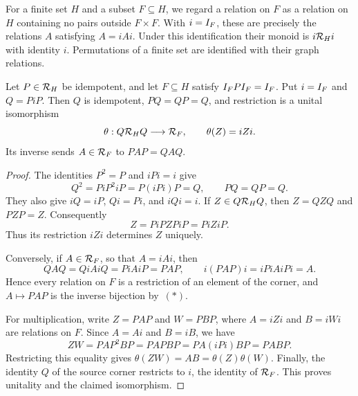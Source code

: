 For a finite set $H$ and a subset $F\subseteq H$, we regard a relation
on $F$ as a relation on $H$ containing no pairs outside $F\times F$.
With $i=I_{F}$, these are precisely the relations $A$ satisfying
$A=iAi$. Under this identification their monoid is $i\mathcal R_{H}i$ with
identity $i$. Permutations of a finite set are identified with their
graph relations.

\begin{lemma}
\label{lem:relation-corner}
Let $P\in\mathcal R_{H}$ be idempotent, and let $F\subseteq H$ satisfy
$I_{F}PI_{F}=I_{F}$.  Put $i=I_{F}$ and $Q=PiP$.
Then $Q$ is idempotent, $PQ=QP=Q$, and restriction is a unital
isomorphism
\[
  \theta:Q\mathcal R_{H}Q\longrightarrow\mathcal R_{F},
  \qquad \theta(Z)=iZi.
\]
Its inverse sends $A\in\mathcal R_{F}$ to $PAP=QAQ$.
\end{lemma}

\begin{proof}
The identities $P^2=P$ and $iPi=i$ give
\[
  Q^2=PiP^2iP=P(iPi)P=Q,
  \qquad PQ=QP=Q.
\]
They also give $iQ=iP$, $Qi=Pi$, and $iQi=i$.
If $Z\in Q\mathcal R_{H}Q$, then $Z=QZQ$ and $PZP=Z$.  Consequently
\[
  Z=PiPZPiP=PiZiP.                         \tag{$*$}
\]
Thus its restriction $iZi$ determines $Z$ uniquely.

Conversely, if $A\in\mathcal R_{F}$, so that $A=iAi$, then
\[
  QAQ=QiAiQ=PiAiP=PAP,
  \qquad
  i(PAP)i=iPiAiPi=A.
\]
Hence every relation on $F$ is a restriction of an element of the
corner, and $A\mapsto PAP$ is the inverse bijection by~$(*)$.

For multiplication, write $Z=PAP$ and $W=PBP$, where
$A=iZi$ and $B=iWi$ are relations on $F$.  Since $A=Ai$ and
$B=iB$, we have
\[
  ZW=PAP^2BP=PAPBP
     =PA(iPi)BP=PABP.
\]
Restricting this equality gives $\theta(ZW)=AB=\theta(Z)\theta(W)$.
Finally, the identity $Q$ of the source corner restricts to $i$, the
identity of $\mathcal R_{F}$.  This proves unitality and the claimed isomorphism.
\end{proof}
